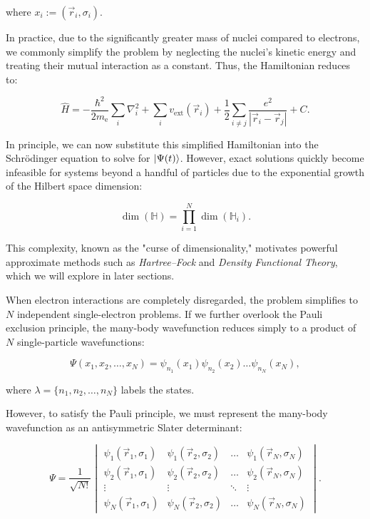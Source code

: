 where $x_i:=(\vec{r}_i,\sigma_i)$.

In practice, due to the significantly greater mass of nuclei compared to electrons, we commonly simplify the problem by neglecting the nuclei’s kinetic energy and treating their mutual interaction as a constant. Thus, the Hamiltonian reduces to:

\begin{equation}
    \hat{H}=-\frac{\hbar^2}{2m_\mathrm{e}}\sum_i\nabla_i^2
    +\sum_i v_\text{ext}(\vec{r}_i)
    +\frac{1}{2}\sum_{i\neq j}\frac{e^2}{|\vec{r}_i-\vec{r}_j|}+C.
    \label{many_body_hamiltonian_simplified}
\end{equation}

In principle, we can now substitute this simplified Hamiltonian into the Schrödinger equation to solve for $\ket{\Psi(t)}$. However, exact solutions quickly become infeasible for systems beyond a handful of particles due to the exponential growth of the Hilbert space dimension:

\begin{equation}
    \dim(\mathbb{H})=\prod_{i=1}^{N} \dim(\mathbb{H}_i).
    \label{exponential_growth}
\end{equation}

This complexity, known as the "curse of dimensionality," motivates powerful approximate methods such as \textit{Hartree--Fock} and \textit{Density Functional Theory}, which we will explore in later sections.

When electron interactions are completely disregarded, the problem simplifies to $N$ independent single-electron problems. If we further overlook the Pauli exclusion principle, the many-body wavefunction reduces simply to a product of $N$ single-particle wavefunctions:

\begin{equation}
    \Psi(x_1,x_2,\dots,x_N)=\psi_{n_1}(x_1)\psi_{n_2}(x_2)\dots\psi_{n_N}(x_N),
    \label{independent_body_function}
\end{equation}

where $\lambda=\{n_1,n_2,\dots,n_N\}$ labels the states.

However, to satisfy the Pauli principle, we must represent the many-body wavefunction as an antisymmetric Slater determinant:

\begin{equation}
    \Psi = \frac{1}{\sqrt{N!}}
    \begin{vmatrix}
    \psi_1(\vec{r}_1,\sigma_1) & \psi_1(\vec{r}_2,\sigma_2) & \dots & \psi_1(\vec{r}_N,\sigma_N)\\
    \psi_2(\vec{r}_1,\sigma_1) & \psi_2(\vec{r}_2,\sigma_2) & \dots & \psi_2(\vec{r}_N,\sigma_N)\\
    \vdots & \vdots & \ddots & \vdots\\
    \psi_N(\vec{r}_1,\sigma_1) & \psi_N(\vec{r}_2,\sigma_2) & \dots & \psi_N(\vec{r}_N,\sigma_N)
    \end{vmatrix}.
    \label{slater_determinant}
\end{equation}

